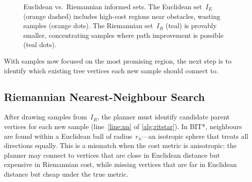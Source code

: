 \documentclass[journal]{IEEEtran}
\newcommand{\IR}{I_{\!R}}
\newcommand{\IE}{I_{\!E}}
\begin{document}
\begin{figure}[t]
\centering
{}
\caption{Euclidean vs.\ Riemannian informed sets.
  The Euclidean set~$\IE$ (orange dashed) includes high-cost regions
  near obstacles, wasting samples (orange dots).
  The Riemannian set~$\IR$ (teal) is provably smaller, concentrating
  samples where path improvement is possible (teal dots).}
\label{fig:sampling_concept}
\end{figure}

With samples now focused on the most promising region, the next
step is to identify which existing tree vertices each new sample
should connect to.


\subsection{Riemannian Nearest-Neighbour Search}\label{sec:nn}

After drawing samples from~$\IR$, the planner must identify
candidate parent vertices for each new sample
(line~\ref{line:nn} of \cref{alg:ritstar}).
In BIT*, neighbours are found within a Euclidean ball of
radius~$r_n$---an isotropic sphere that treats all directions
equally.
This is a mismatch when the cost metric is anisotropic: the planner
may connect to vertices that are close in Euclidean distance but
expensive in Riemannian cost, while missing vertices that are far
in Euclidean distance but cheap under the true metric.
\end{document}
